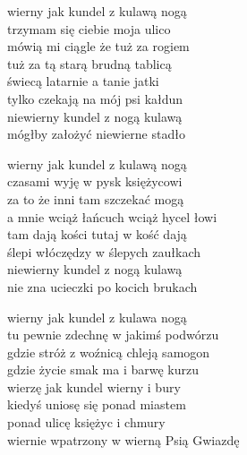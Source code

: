 \begin{text}
    wierny jak kundel z kulawą nogą\\
    trzymam się ciebie moja ulico\\
    mówią mi ciągle że tuż za rogiem\\
    tuż za tą starą brudną tablicą\\
    świecą latarnie a tanie jatki\\
    tylko czekają na mój psi kałdun\\
    niewierny kundel z nogą kulawą\\
    mógłby założyć niewierne stadło

    wierny jak kundel z kulawą nogą\\
    czasami wyję w pysk księżycowi\\
    za to że inni tam szczekać mogą\\
    a mnie wciąż łańcuch wciąż hycel łowi\\
    tam dają kości tutaj w kość dają\\
    ślepi włóczędzy w ślepych zaułkach\\
    niewierny kundel z nogą kulawą\\
    nie zna ucieczki po kocich brukach

    wierny jak kundel z kulawa nogą\\
    tu pewnie zdechnę w jakimś podwórzu\\
    gdzie stróż z woźnicą chleją samogon\\
    gdzie życie smak ma i barwę kurzu\\
    wierzę jak kundel wierny i bury\\
    kiedyś uniosę się ponad miastem\\
    ponad ulicę księżyc i chmury\\
    wiernie wpatrzony w wierną Psią Gwiazdę
\end{text}
\begin{chord}

\end{chord}